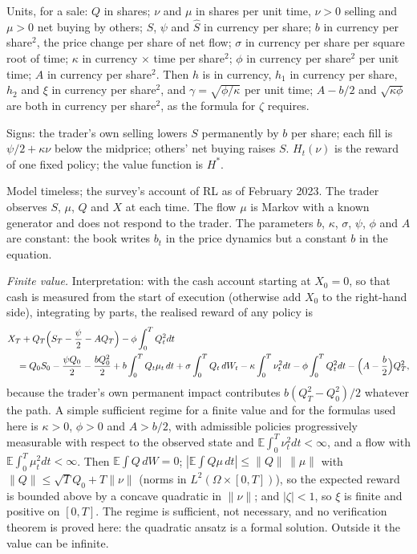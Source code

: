 \begin{qfmodel}
 Units, for a sale: $Q$ in shares; $\nu$ and $\mu$ in shares per unit time, $\nu>0$ selling and $\mu>0$ net buying by others; $S$, $\psi$ and $\hat S$ in currency per share; $b$ in currency per share$^2$, the price change per share of net flow; $\sigma$ in currency per share per square root of time; $\kappa$ in currency $\times$ time per share$^2$; $\phi$ in currency per share$^2$ per unit time; $A$ in currency per share$^2$. Then $h$ is in currency, $h_1$ in currency per share, $h_2$ and $\xi$ in currency per share$^2$, and $\gamma=\sqrt{\phi/\kappa}$ per unit time; $A-b/2$ and $\sqrt{\kappa\phi}$ are both in currency per share$^2$, as the formula for $\zeta$ requires.

Signs: the trader's own selling lowers $S$ permanently by $b$ per share; each fill is $\psi/2+\kappa\nu$ below the midprice; others' net buying raises $S$. $H_t(\nu)$ is the reward of one fixed policy; the value function is $H^*$.

 Model timeless; the survey's account of RL as of February 2023. The trader observes $S$, $\mu$, $Q$ and $X$ at each time. The flow $\mu$ is Markov with a known generator and does not respond to the trader. The parameters $b$, $\kappa$, $\sigma$, $\psi$, $\phi$ and $A$ are constant: the book writes $b_t$ in the price dynamics but a constant $b$ in the equation.

\emph{Finite value.} Interpretation: with the cash account starting at $X_0=0$, so that cash is measured from the start of execution (otherwise add $X_0$ to the right-hand side), integrating by parts, the realised reward of any policy is
\[ \begin{aligned} &X_T+Q_T\Bigl(S_T-\frac\psi2-AQ_T\Bigr)-\phi\int_0^TQ_t^2dt\\ &\quad=Q_0S_0-\frac{\psi Q_0}2-\frac{bQ_0^2}2+b\int_0^TQ_t\mu_t\,dt+\sigma\int_0^TQ_t\,dW_t-\kappa\int_0^T\nu_t^2dt-\phi\int_0^TQ_t^2dt-\Bigl(A-\frac b2\Bigr)Q_T^2, \end{aligned} \]
because the trader's own permanent impact contributes $b(Q_T^2-Q_0^2)/2$ whatever the path. A simple sufficient regime for a finite value and for the formulas used here is $\kappa>0$, $\phi>0$ and $A>b/2$, with admissible policies progressively measurable with respect to the observed state and $\mathbb E\int_0^T\nu_t^2dt<\infty$, and a flow with $\mathbb E\int_0^T\mu_t^2dt<\infty$. Then $\mathbb E\int Q\,dW=0$; $|\mathbb E\int Q\mu\,dt|\le\|Q\|\,\|\mu\|$ with $\|Q\|\le\sqrt TQ_0+T\|\nu\|$ (norms in $L^2(\Omega\times[0,T])$), so the expected reward is bounded above by a concave quadratic in $\|\nu\|$; and $|\zeta|<1$, so $\xi$ is finite and positive on $[0,T]$. The regime is sufficient, not necessary, and no verification theorem is proved here: the quadratic ansatz is a formal solution. Outside it the value can be infinite.


\end{qfmodel}
